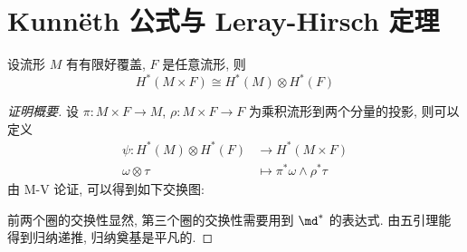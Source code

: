     \section{Kunn\"{e}th 公式与 Leray-Hirsch 定理}
    \begin{theorem}[Kunn\"{e}th 公式]
        设流形 $M$ 有有限好覆盖, $F$ 是任意流形, 则
        \begin{equation*}
            H^*(M\times F)\cong H^*(M)\otimes H^*(F)
        \end{equation*}
    \end{theorem}

    \begin{proof}[证明概要]
        设 $\pi:M\times F\rightarrow M$, $\rho:M\times F\rightarrow F$ 为乘积流形到两个分量的投影, 则可以定义
        \begin{align*}
            \psi:H^*(M)\otimes H^*(F)&\rightarrow H^*(M\times F) \\
            \omega\otimes\tau&\mapsto\pi^*\omega\wedge\rho^*\tau
        \end{align*}
        由 M-V 论证, 可以得到如下交换图:


        前两个圈的交换性显然, 第三个圈的交换性需要用到 $\md^*$ 的表达式. 由五引理能得到归纳递推, 归纳奠基是平凡的.
    \end{proof}

